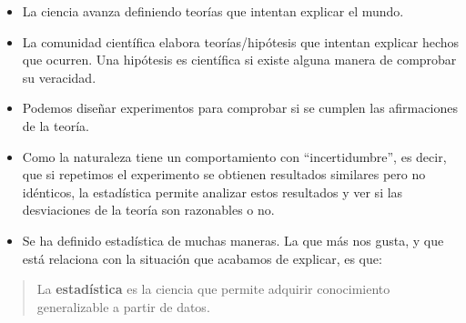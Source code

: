 \documentclass[
  spanish,
  letterpaper,
  DIV=11,
  numbers=noendperiod]{scrreprt}
\begin{document}
\begin{itemize}
\item
  La ciencia avanza definiendo teorías que intentan explicar el mundo.
\item
  La comunidad científica elabora teorías/hipótesis que intentan
  explicar hechos que ocurren. Una hipótesis es científica si existe
  alguna manera de comprobar su veracidad.
\item
  Podemos diseñar experimentos para comprobar si se cumplen las
  afirmaciones de la teoría.
\item
  Como la naturaleza tiene un comportamiento con ``incertidumbre'', es
  decir, que si repetimos el experimento se obtienen resultados
  similares pero no idénticos, la estadística permite analizar estos
  resultados y ver si las desviaciones de la teoría son razonables o no.
\item
  Se ha definido estadística de muchas maneras. La que más nos gusta, y
  que está relaciona con la situación que acabamos de explicar, es que:
\end{itemize}

\begin{quote}
La \textbf{estadística} es la ciencia que permite adquirir conocimiento
generalizable a partir de datos.
\end{quote}
\end{document}
